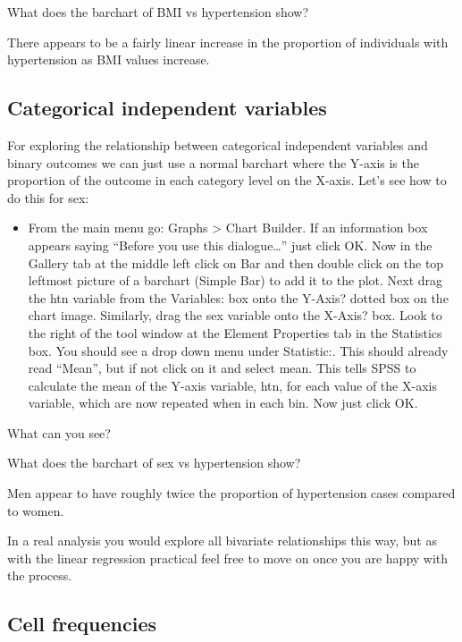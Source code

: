 \documentclass[
]{book}
\providecommand{\tightlist}{%
  \setlength{\itemsep}{0pt}\setlength{\parskip}{0pt}}
\begin{document}
What does the barchart of BMI vs hypertension show?

There appears to be a fairly linear increase in the proportion of individuals with hypertension as BMI values increase.

\hypertarget{categorical-independent-variables-1}{%
\subsection{Categorical independent variables}\label{categorical-independent-variables-1}}

For exploring the relationship between categorical independent variables and binary outcomes we can just use a normal barchart where the Y-axis is the proportion of the outcome in each category level on the X-axis. Let's see how to do this for sex:

\begin{itemize}
\tightlist
\item
  From the main menu go: Graphs \textgreater{} Chart Builder. If an information box appears saying ``Before you use this dialogue\ldots{}'' just click OK. Now in the Gallery tab at the middle left click on Bar and then double click on the top leftmost picture of a barchart (Simple Bar) to add it to the plot. Next drag the htn variable from the Variables: box onto the Y-Axis? dotted box on the chart image. Similarly, drag the sex variable onto the X-Axis? box. Look to the right of the tool window at the Element Properties tab in the Statistics box. You should see a drop down menu under Statistic:. This should already read ``Mean'', but if not click on it and select mean. This tells SPSS to calculate the mean of the Y-axis variable, htn, for each value of the X-axis variable, which are now repeated when in each bin. Now just click OK.
\end{itemize}

What can you see?

What does the barchart of sex vs hypertension show?

Men appear to have roughly twice the proportion of hypertension cases compared to women.

In a real analysis you would explore all bivariate relationships this way, but as with the linear regression practical feel free to move on once you are happy with the process.

\hypertarget{cell-frequencies}{%
\subsection{Cell frequencies}\label{cell-frequencies}}
\end{document}
